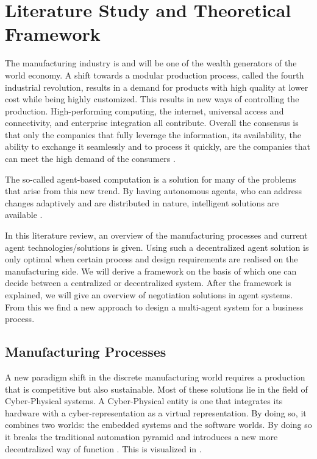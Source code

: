 \chapter{Literature Study and Theoretical Framework}
\label{ch:literature}
The manufacturing industry is and will be one of the wealth generators of the world economy. A shift towards a modular production process, called the fourth industrial revolution, results in a demand for products with high quality at lower cost while being highly customized. This results in new ways of controlling the production. High-performing computing, the internet, universal access and connectivity, and enterprise integration all contribute. Overall the consensus is that only the companies that fully leverage the information, its availability, the ability to exchange it seamlessly and to process it quickly, are the companies that can meet the high demand of the consumers \citep{monostori2006agent}.

The so-called agent-based computation is a solution for many of the problems that arise from this new trend. By having autonomous agents, who can address changes adaptively and are distributed in nature, intelligent solutions are available \citep{monostori2006agent}.

In this literature review, an overview of the manufacturing processes and current agent technologies/solutions is given. Using such a decentralized agent solution is only optimal when certain process and design requirements are realised on the manufacturing side. We will derive a framework  on the basis of which one can decide between a centralized or decentralized system. After the framework is explained, we will give an overview of negotiation solutions in agent systems. From this we find a new approach to design a multi-agent system for a business process.

\section{Manufacturing Processes}
\label{lit:manufacture}
A new paradigm shift in the discrete manufacturing world requires a production that is competitive but also sustainable. Most of these solutions lie in the field of Cyber-Physical systems. A Cyber-Physical entity is one that integrates its hardware with a cyber-representation as a virtual representation. By doing so, it combines two worlds: the embedded systems and the software worlds. By doing so it breaks the traditional automation pyramid and introduces a new more decentralized way of function \citep{leitao2016smart}. This is visualized in . %
	
